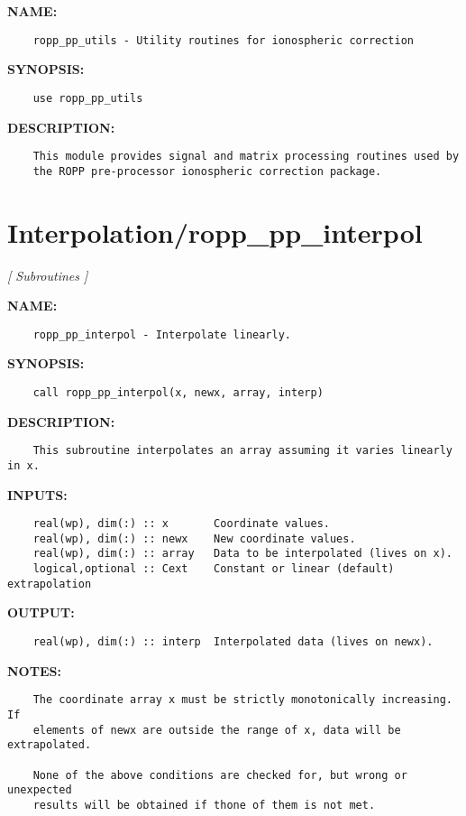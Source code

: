 \label{ch:robo49}
\label{ch:Modules_ropp_pp_utils}
\textbf{NAME:}\hspace{0.08in}\begin{Verbatim}
    ropp_pp_utils - Utility routines for ionospheric correction 
\end{Verbatim}
\textbf{SYNOPSIS:}\hspace{0.08in}\begin{Verbatim}
    use ropp_pp_utils
\end{Verbatim}
\textbf{DESCRIPTION:}\hspace{0.08in}\begin{Verbatim}
    This module provides signal and matrix processing routines used by
    the ROPP pre-processor ionospheric correction package.
\end{Verbatim}
\section{Interpolation/ropp\_pp\_interpol}
\textsl{[ Subroutines ]}

\label{ch:robo25}
\label{ch:Interpolation_ropp_pp_interpol}
\textbf{NAME:}\hspace{0.08in}\begin{Verbatim}
    ropp_pp_interpol - Interpolate linearly.
\end{Verbatim}
\textbf{SYNOPSIS:}\hspace{0.08in}\begin{Verbatim}
    call ropp_pp_interpol(x, newx, array, interp)
\end{Verbatim}
\textbf{DESCRIPTION:}\hspace{0.08in}\begin{Verbatim}
    This subroutine interpolates an array assuming it varies linearly in x.
\end{Verbatim}
\textbf{INPUTS:}\hspace{0.08in}\begin{Verbatim}
    real(wp), dim(:) :: x       Coordinate values.
    real(wp), dim(:) :: newx    New coordinate values.
    real(wp), dim(:) :: array   Data to be interpolated (lives on x).
    logical,optional :: Cext    Constant or linear (default) extrapolation
\end{Verbatim}
\textbf{OUTPUT:}\hspace{0.08in}\begin{Verbatim}
    real(wp), dim(:) :: interp  Interpolated data (lives on newx).
\end{Verbatim}
\textbf{NOTES:}\hspace{0.08in}\begin{Verbatim}
    The coordinate array x must be strictly monotonically increasing. If
    elements of newx are outside the range of x, data will be extrapolated.

    None of the above conditions are checked for, but wrong or unexpected
    results will be obtained if thone of them is not met.
\end{Verbatim}
